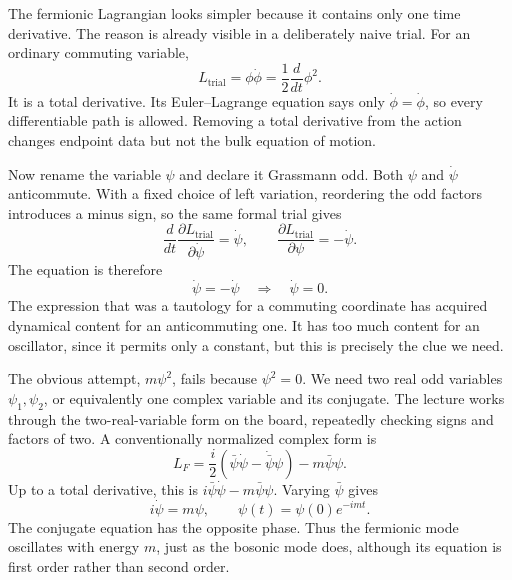 The fermionic Lagrangian looks simpler because it contains only one time derivative. The reason is already visible in a deliberately naive trial. For an ordinary commuting variable,
\begin{equation}
L_{\mathrm{trial}}=\phi\dot\phi
=\frac{1}{2}\frac{d}{dt}\phi^2.
\end{equation}
It is a total derivative. Its Euler--Lagrange equation says only \(\dot\phi=\dot\phi\), so every differentiable path is allowed. Removing a total derivative from the action changes endpoint data but not the bulk equation of motion.

Now rename the variable \(\psi\) and declare it Grassmann odd. Both \(\psi\) and \(\dot\psi\) anticommute. With a fixed choice of left variation, reordering the odd factors introduces a minus sign, so the same formal trial gives
\begin{equation}
\frac{d}{dt}\frac{\partial L_{\mathrm{trial}}}{\partial\dot\psi}
=\dot\psi,
\qquad
\frac{\partial L_{\mathrm{trial}}}{\partial\psi}
=-\dot\psi.
\end{equation}
The equation is therefore
\begin{equation}
\dot\psi=-\dot\psi
\quad\Longrightarrow\quad
\dot\psi=0.
\label{eq:l7-constant-fermion}
\end{equation}
The expression that was a tautology for a commuting coordinate has acquired dynamical content for an anticommuting one. It has too much content for an oscillator, since it permits only a constant, but this is precisely the clue we need.

\begin{classroomqa}
\end{classroomqa}

The obvious attempt, \(m\psi^2\), fails because \(\psi^2=0\). We need two real odd variables \(\psi_1,\psi_2\), or equivalently one complex variable and its conjugate. The lecture works through the two-real-variable form on the board, repeatedly checking signs and factors of two. A conventionally normalized complex form is
\begin{equation}
L_F=\frac{i}{2}
\left(\bar\psi\dot\psi-\dot{\bar\psi}\psi\right)
-m\bar\psi\psi.
\label{eq:l7-fermion-lagrangian}
\end{equation}
Up to a total derivative, this is \(i\bar\psi\dot\psi-m\bar\psi\psi\). Varying \(\bar\psi\) gives
\begin{equation}
i\dot\psi=m\psi,
\qquad
\psi(t)=\psi(0)e^{-imt}.
\label{eq:l7-fermion-eom}
\end{equation}
The conjugate equation has the opposite phase. Thus the fermionic mode oscillates with energy \(m\), just as the bosonic mode does, although its equation is first order rather than second order.


